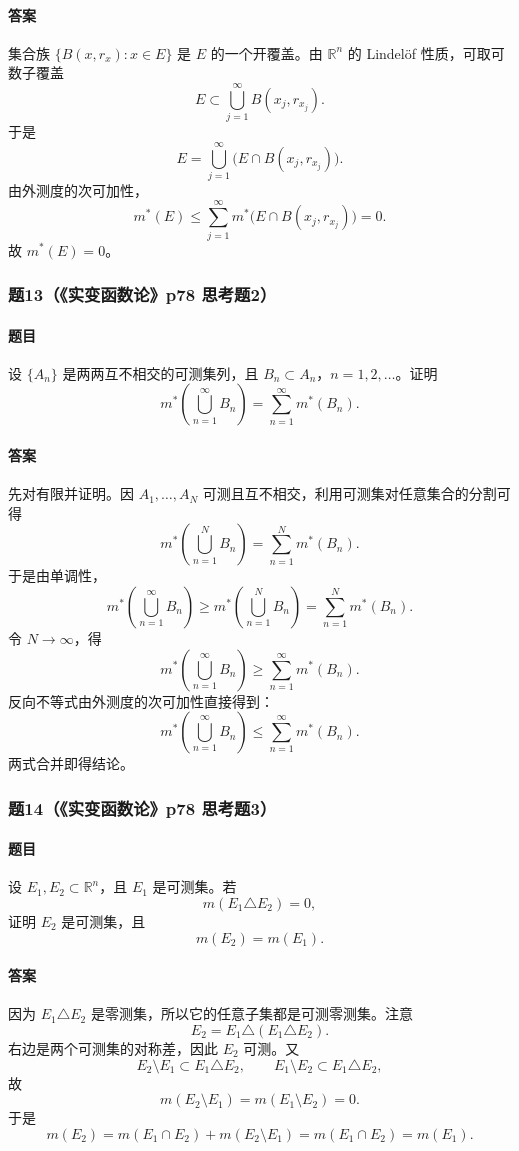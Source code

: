 \documentclass{article}
\newcommand{\R}{\mathbb{R}}
\newcommand{\meas}{m}
\newcommand{\mouter}{m^*}
\begin{document}
\paragraph{答案}集合族 $\{B(x,r_x):x\in E\}$ 是 $E$ 的一个开覆盖。由 $\R^n$ 的 Lindelöf 性质，可取可数子覆盖
\[
E\subset\bigcup_{j=1}^{\infty}B(x_j,r_{x_j}).
\]
于是
\[
E=\bigcup_{j=1}^{\infty}\bigl(E\cap B(x_j,r_{x_j})\bigr).
\]
由外测度的次可加性，
\[
\mouter(E)
\le\sum_{j=1}^{\infty}\mouter\bigl(E\cap B(x_j,r_{x_j})\bigr)=0.
\]
故 $\mouter(E)=0$。

\subsubsection*{题13（《实变函数论》p78 思考题2）}
\paragraph{题目}设 $\{A_n\}$ 是两两互不相交的可测集列，且 $B_n\subset A_n$，$n=1,2,\ldots$。证明
\[
\mouter\left(\bigcup_{n=1}^{\infty}B_n\right)=\sum_{n=1}^{\infty}\mouter(B_n).
\]

\paragraph{答案}先对有限并证明。因 $A_1,\ldots,A_N$ 可测且互不相交，利用可测集对任意集合的分割可得
\[
\mouter\left(\bigcup_{n=1}^{N}B_n\right)=\sum_{n=1}^{N}\mouter(B_n).
\]
于是由单调性，
\[
\mouter\left(\bigcup_{n=1}^{\infty}B_n\right)
\ge
\mouter\left(\bigcup_{n=1}^{N}B_n\right)
=
\sum_{n=1}^{N}\mouter(B_n).
\]
令 $N\to\infty$，得
\[
\mouter\left(\bigcup_{n=1}^{\infty}B_n\right)
\ge
\sum_{n=1}^{\infty}\mouter(B_n).
\]
反向不等式由外测度的次可加性直接得到：
\[
\mouter\left(\bigcup_{n=1}^{\infty}B_n\right)
\le
\sum_{n=1}^{\infty}\mouter(B_n).
\]
两式合并即得结论。

\subsubsection*{题14（《实变函数论》p78 思考题3）}
\paragraph{题目}设 $E_1,E_2\subset\R^n$，且 $E_1$ 是可测集。若
\[
\meas(E_1\triangle E_2)=0,
\]
证明 $E_2$ 是可测集，且
\[
\meas(E_2)=\meas(E_1).
\]

\paragraph{答案}因为 $E_1\triangle E_2$ 是零测集，所以它的任意子集都是可测零测集。注意
\[
E_2=E_1\triangle(E_1\triangle E_2).
\]
右边是两个可测集的对称差，因此 $E_2$ 可测。又
\[
E_2\setminus E_1\subset E_1\triangle E_2,
\qquad
E_1\setminus E_2\subset E_1\triangle E_2,
\]
故
\[
\meas(E_2\setminus E_1)=\meas(E_1\setminus E_2)=0.
\]
于是
\[
\meas(E_2)=\meas(E_1\cap E_2)+\meas(E_2\setminus E_1)
=\meas(E_1\cap E_2)
=\meas(E_1).
\]
\end{document}

